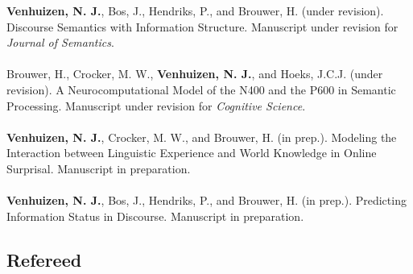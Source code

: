 \documentclass[a4paper,10pt]{article}
\begin{document}
\noindent
    \textbf{Venhuizen, N. J.}, Bos, J., Hendriks, P., and Brouwer, H.
    (under revision). Discourse Semantics with Information Structure.
    Manuscript under revision for \textit{Journal of Semantics}.\\
    \\
    Brouwer, H., Crocker, M. W., \textbf{Venhuizen, N. J.}, and Hoeks, J.C.J.
    (under revision). A Neurocomputational Model of the N400 and the P600 in
    Semantic Processing. Manuscript under revision for \textit{Cognitive Science}.\\
    \\
    \textbf{Venhuizen, N. J.}, Crocker, M. W., and Brouwer, H. 
    (in prep.). Modeling the Interaction between Linguistic Experience and
    World Knowledge in Online Surprisal. Manuscript in preparation.\\
    \\
    \textbf{Venhuizen, N. J.}, Bos, J., Hendriks, P., and Brouwer, H. 
    (in prep.). Predicting Information Status in Discourse. Manuscript in
    preparation.

\subsection*{Refereed}
\end{document}
